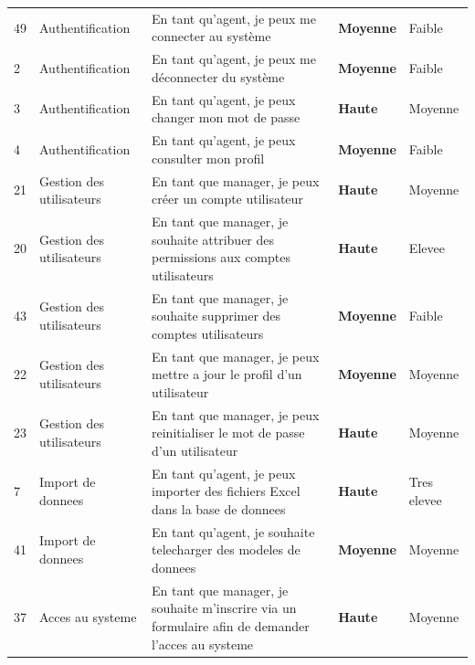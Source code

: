 \documentclass[a4paper,12pt]{report}
\begin{document}
\begin{longtable}{|C{0.8cm}|L{2.8cm}|L{6.1cm}|C{2cm}|C{2.8cm}|}
49 & Authentification       & En tant qu'agent, je peux me connecter au système                                                   & \textcolor{moyenne}{\textbf{Moyenne}} & Faible     \\
2  & Authentification       & En tant qu'agent, je peux me déconnecter du système                                                 & \textcolor{moyenne}{\textbf{Moyenne}} & Faible     \\
3  & Authentification       & En tant qu'agent, je peux changer mon mot de passe                                                  & \textcolor{haute}{\textbf{Haute}}     & Moyenne    \\
4  & Authentification       & En tant qu'agent, je peux consulter mon profil                                                      & \textcolor{moyenne}{\textbf{Moyenne}} & Faible     \\
21 & Gestion des utilisateurs & En tant que manager, je peux créer un compte utilisateur                                          & \textcolor{haute}{\textbf{Haute}}     & Moyenne    \\
20 & Gestion des utilisateurs & En tant que manager, je souhaite attribuer des permissions aux comptes utilisateurs                & \textcolor{haute}{\textbf{Haute}}     & Elevee     \\
43 & Gestion des utilisateurs & En tant que manager, je souhaite supprimer des comptes utilisateurs                                & \textcolor{moyenne}{\textbf{Moyenne}} & Faible     \\
22 & Gestion des utilisateurs & En tant que manager, je peux mettre a jour le profil d'un utilisateur                              & \textcolor{moyenne}{\textbf{Moyenne}} & Moyenne    \\
23 & Gestion des utilisateurs & En tant que manager, je peux reinitialiser le mot de passe d'un utilisateur                        & \textcolor{haute}{\textbf{Haute}}     & Moyenne    \\
7  & Import de donnees      & En tant qu'agent, je peux importer des fichiers Excel dans la base de donnees                       & \textcolor{haute}{\textbf{Haute}}     & Tres elevee\\
41 & Import de donnees      & En tant qu'agent, je souhaite telecharger des modeles de donnees                                    & \textcolor{moyenne}{\textbf{Moyenne}} & Moyenne    \\
37 & Acces au systeme       & En tant que manager, je souhaite m'inscrire via un formulaire afin de demander l'acces au systeme   & \textcolor{haute}{\textbf{Haute}}     & Moyenne    \\

\end{longtable}
\end{document}
